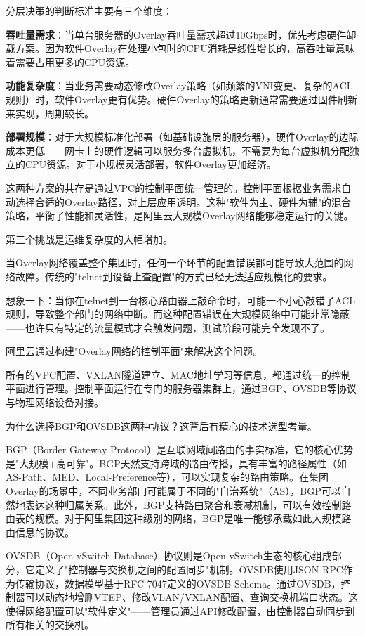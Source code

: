 分层决策的判断标准主要有三个维度：

\textbf{吞吐量需求}：当单台服务器的Overlay吞吐量需求超过10Gbps时，优先考虑硬件卸载方案。因为软件Overlay在处理小包时的CPU消耗是线性增长的，高吞吐量意味着需要占用更多的CPU资源。

\textbf{功能复杂度}：当业务需要动态修改Overlay策略（如频繁的VNI变更、复杂的ACL规则）时，软件Overlay更有优势。硬件Overlay的策略更新通常需要通过固件刷新来实现，周期较长。

\textbf{部署规模}：对于大规模标准化部署（如基础设施层的服务器），硬件Overlay的边际成本更低——网卡上的硬件逻辑可以服务多台虚拟机，不需要为每台虚拟机分配独立的CPU资源。对于小规模灵活部署，软件Overlay更加经济。

这两种方案的共存是通过VPC的控制平面统一管理的。控制平面根据业务需求自动选择合适的Overlay路径，对上层应用透明。这种"软件为主、硬件为辅"的混合策略，平衡了性能和灵活性，是阿里云大规模Overlay网络能够稳定运行的关键。

第三个挑战是运维复杂度的大幅增加。

当Overlay网络覆盖整个集团时，任何一个环节的配置错误都可能导致大范围的网络故障。传统的"telnet到设备上查配置"的方式已经无法适应规模化的要求。

想象一下：当你在telnet到一台核心路由器上敲命令时，可能一不小心敲错了ACL规则，导致整个部门的网络中断。而这种配置错误在大规模网络中可能非常隐蔽——也许只有特定的流量模式才会触发问题，测试阶段可能完全发现不了。

阿里云通过构建"Overlay网络的控制平面"来解决这个问题。

所有的VPC配置、VXLAN隧道建立、MAC地址学习等信息，都通过统一的控制平面进行管理。控制平面运行在专门的服务器集群上，通过BGP、OVSDB等协议与物理网络设备对接。

为什么选择BGP和OVSDB这两种协议？这背后有精心的技术选型考量。

BGP（Border Gateway Protocol）是互联网域间路由的事实标准，它的核心优势是"大规模+高可靠"。BGP天然支持跨域的路由传播，具有丰富的路径属性（如AS-Path、MED、Local-Preference等），可以实现复杂的路由策略。在集团Overlay的场景中，不同业务部门可能属于不同的"自治系统"（AS），BGP可以自然地表达这种归属关系。此外，BGP支持路由聚合和衰减机制，可以有效控制路由表的规模。对于阿里集团这种级别的网络，BGP是唯一能够承载如此大规模路由信息的协议。

OVSDB（Open vSwitch Database）协议则是Open vSwitch生态的核心组成部分，它定义了"控制器与交换机之间的配置同步"机制。OVSDB使用JSON-RPC作为传输协议，数据模型基于RFC 7047定义的OVSDB Schema。通过OVSDB，控制器可以动态地增删VTEP、修改VLAN/VXLAN配置、查询交换机端口状态。这使得网络配置可以"软件定义"——管理员通过API修改配置，由控制器自动同步到所有相关的交换机。

